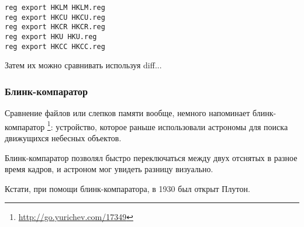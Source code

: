 \begin{lstlisting}
reg export HKLM HKLM.reg
reg export HKCU HKCU.reg
reg export HKCR HKCR.reg
reg export HKU HKU.reg
reg export HKCC HKCC.reg
\end{lstlisting}

Затем их можно сравнивать используя diff...

\subsubsection{Блинк-компаратор}

Сравнение файлов или слепков памяти вообще, немного напоминает блинк-компаратор
\footnote{\url{http://go.yurichev.com/17349}}:
устройство, которое раньше использовали астрономы для поиска движущихся небесных объектов.

Блинк-компаратор позволял быстро переключаться между двух отснятых в разное время кадров,
и астроном мог увидеть разницу визуально.

Кстати, при помощи блинк-компаратора, в 1930 был открыт Плутон.


